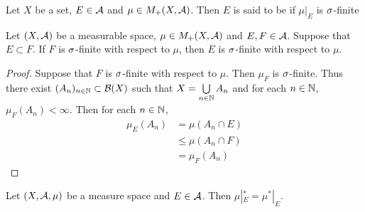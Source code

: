 \documentclass{book}
\begin{document}
	\begin{defn}  
		Let $X$ be a set, $E \in \mathcal{A}$ and $\mu \in M_+(X, \mathcal{A})$. Then $E$ is said to be  if $\mu|_E$ is $\sigma$-finite
	\end{defn}

	\begin{ex} 
		Let $(X, \mathcal{A})$ be a measurable space, $\mu \in M_+(X, \mathcal{A})$ and $E,F \in \mathcal{A}$. Suppose that $E \subset F$. If $F$ is $\sigma$-finite with respect to $\mu$, then $E$ is $\sigma$-finite with respect to $\mu$.
	\end{ex}

	\begin{proof}
		Suppose that $F$ is $\sigma$-finite with respect to $\mu$. Then $\mu_F$ is $\sigma$-finite. Thus there exist $(A_n)_{n \in \mathbb{N}} \subset \mathcal{B}(X)$ such that $X = \bigcup\limits_{n \in \mathbb{N}} A_n$ and for each $n \in \mathbb{N}$, $\mu_F(A_n) < \infty$. Then for each $n \in \mathbb{N}$, 
		\begin{align*}
			\mu_E(A_n)
			& = \mu(A_n \cap E) \\
			& \leq \mu(A_n \cap F) \\
			& = \mu_F(A_n) 
		\end{align*}
	\end{proof}

	\begin{ex}  
		Let $(X, \mathcal{A}, \mu)$ be a measure space and $E \in \mathcal{A}$. Then $\mu|_E^* = \mu^*|_E$.
	\end{ex}
\end{document}
